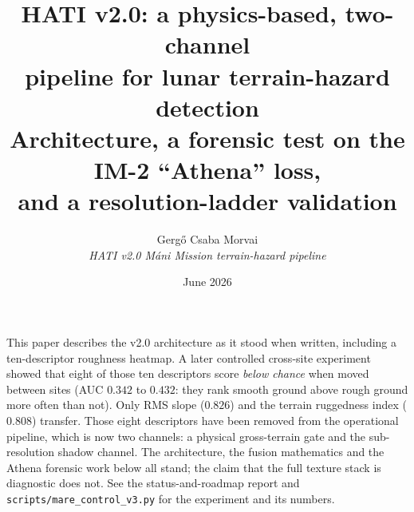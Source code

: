 \documentclass[11pt]{article}
\title{\sffamily\bfseries\color{hatiblue}\LARGE HATI v2.0: a physics-based, two-channel\\ pipeline for lunar terrain-hazard detection\\[4pt]
\Large\mdseries Architecture, a forensic test on the IM-2 ``Athena'' loss,\\ and a resolution-ladder validation}
\author{\large Gergő Csaba Morvai\\[2pt]
\normalsize\itshape HATI v2.0 \textendash{} M\'ani Mission terrain-hazard pipeline}
\date{\normalsize June 2026}
\begin{document}
\maketitle

\begin{tcolorbox}[colback=limitbg,colframe=limitframe,boxrule=0.9pt,arc=2pt,
  left=8pt,right=8pt,top=6pt,bottom=6pt,fonttitle=\bfseries\sffamily\small,
  coltitle=limitframe,attach boxed title to top left={xshift=8pt,yshift=-7pt},
  boxed title style={colback=limitbg,colframe=limitframe,boxrule=0.4pt,arc=1pt},
  title={Superseded in part, June 2026}]
\small
This paper describes the v2.0 architecture as it stood when written, including a ten-descriptor
roughness heatmap. A later controlled cross-site experiment showed that eight of those ten
descriptors score \emph{below chance} when moved between sites (AUC $0.342$ to $0.432$: they rank
smooth ground above rough ground more often than not). Only RMS slope ($0.826$) and the terrain
ruggedness index ($0.808$) transfer. Those eight descriptors have been removed from the
operational pipeline, which is now two channels: a physical gross-terrain gate and the
sub-resolution shadow channel. The architecture, the fusion mathematics and the Athena forensic
work below all stand; the claim that the full texture stack is diagnostic does not. See the
status-and-roadmap report and \texttt{scripts/mare\_control\_v3.py} for the experiment and its
numbers.
\end{tcolorbox}
\medskip
\end{document}
